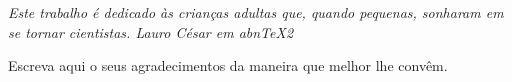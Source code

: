\documentclass[
	12pt,				%
	openright,			%
	oneside,			%
	a4paper,			%
	english,			%
	brazil				%
	]{abntex2}
\theoremstyle{definition}
\begin{document}
\nocite{Vrs:2025}

\frenchspacing 



\imprimircapa{}

\imprimirfolhaderosto{}


%    

\newpage

%
\begin{folhadeaprovacao}
\imprimirfolhadeaprovacao{}
\end{folhadeaprovacao}



\begin{dedicatoria}
    \vspace*{\fill}
    \flushright{}
    \textit{Este trabalho é dedicado às crianças adultas que,
	quando pequenas, sonharam em se tornar cientistas.
	\- Lauro César em abnTeX2}
\end{dedicatoria}

\begin{agradecimentos}

Escreva aqui o seus agradecimentos da maneira que melhor lhe convêm.

\end{agradecimentos}
\end{document}
